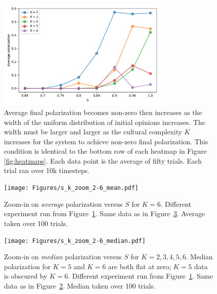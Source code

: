 \documentclass[11pt,letterpaper]{article}
\begin{document}
\begin{figure}[t!]
  \centering
  \includegraphics[width=0.75\textwidth]{Figures/P_vs_S_for_K.pdf}
  \caption{
    Average final polarization becomes non-zero then increases as
    the width of the uniform distribution of initial opinions increases.
    The width must be larger and larger as the cultural complexity $K$ 
    increases for the system to achieve non-zero final polarization. This
    condition is identical to the bottom row of each heatmap in 
    Figure \ref{fig:heatmaps}. Each
    data point is the average of fifty trials. Each trial ran over 
    10k timesteps. 
  }
  \label{fig:p_vs_s_for_k}
\end{figure}


\begin{figure}[t!]
  \centering
    \texttt{[image: Figures/s\_k\_zoom\_2-6\_mean.pdf]}
  \caption{Zoom-in on \emph{average} polarization versus $S$ for $K=6$. 
  Different experiment run from Figure~\ref{fig:p_vs_s_for_k}. 
  Same data as in Figure~\ref{fig:zoom_median}.
  Average taken over 100 trials.}
  \label{fig:zoom_average}
\end{figure}

\begin{figure}[t!]
  \centering
    \texttt{[image: Figures/s\_k\_zoom\_2-6\_median.pdf]}
  \caption{Zoom-in on \emph{median} polarization versus $S$ for $K=2,3,4,5,6$. 
    Median polarization for $K=5$ and $K=6$ are both flat at zero; $K=5$ 
    data is obscured by $K=6$.
    Different experiment run from Figure~\ref{fig:p_vs_s_for_k}.
    Same data as in Figure~\ref{fig:zoom_average}.
    Median taken over 100 trials.
  }
  \label{fig:zoom_median}
\end{figure}
\end{document}
